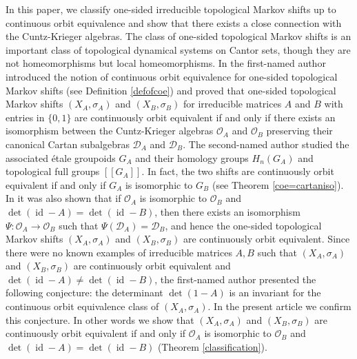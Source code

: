 \documentclass[11pt]{article}
\theoremstyle{definition}
\numberwithin{equation}{section}
\newcommand{\id}{\operatorname{id}}
\begin{document}
In this paper, we classify one-sided irreducible topological Markov shifts 
up to continuous orbit equivalence 
and show that there exists a close connection with the Cuntz-Krieger algebras. 
The class of one-sided topological Markov shifts is 
an important class of topological dynamical systems on Cantor sets, 
though they are not homeomorphisms but local homeomorphisms. 
In \cite{Matsumoto10PJM} the first-named author introduced the notion 
of continuous orbit equivalence for one-sided topological Markov shifts 
(see Definition \ref{defofcoe}) 
and proved that one-sided topological Markov shifts 
$(X_A,\sigma_A)$ and $(X_B,\sigma_B)$ for irreducible matrices $A$ and $B$ 
with entries in $\{0,1\}$ are continuously orbit equivalent 
if and only if there exists an isomorphism 
between the Cuntz-Krieger algebras $\mathcal{O}_A$ and $\mathcal{O}_B$ 
preserving their canonical Cartan subalgebras 
$\mathcal{D}_A$ and $\mathcal{D}_B$. 
The second-named author \cite{Matui12PLMS,Matui12} studied 
the associated \'etale groupoids $G_A$ and 
their homology groups $H_n(G_A)$ and topological full groups $[[G_A]]$. 
In fact, the two shifts are continuously orbit equivalent if and only if 
$G_A$ is isomorphic to $G_B$ (see Theorem \ref{coe=cartaniso}). 
In \cite{Matsumoto13PAMS} it was also shown that 
if $\mathcal{O}_A$ is isomorphic to $\mathcal{O}_B$ and 
$\det(\id-A)=\det(\id-B)$, 
then there exists an isomorphism $\Psi:\mathcal{O}_A\to\mathcal{O}_B$ 
such that $\Psi(\mathcal{D}_A)=\mathcal{D}_B$, 
and hence the one-sided topological Markov shifts 
$(X_A,\sigma_A)$ and $(X_B,\sigma_B)$ are continuously orbit equivalent. 
Since there were no known examples of irreducible matrices $A,B$ such that 
$(X_A,\sigma_A)$ and $(X_B,\sigma_B)$ are continuously orbit equivalent and 
$\det(\id-A)\neq\det(\id-B)$, 
the first-named author \cite[Section 6]{Matsumoto13PAMS} presented 
the following conjecture: 
the determinant $\det(1-A)$ is an invariant 
for the continuous orbit equivalence class of $(X_A,\sigma_A)$. 
In the present article we confirm this conjecture. 
In other words we show that 
$(X_A,\sigma_A)$ and $(X_B,\sigma_B)$ are continuously orbit equivalent 
if and only if $\mathcal{O}_A$ is isomorphic to $\mathcal{O}_B$ and 
$\det(\id-A)=\det(\id-B)$ (Theorem \ref{classification}). 
\end{document}

